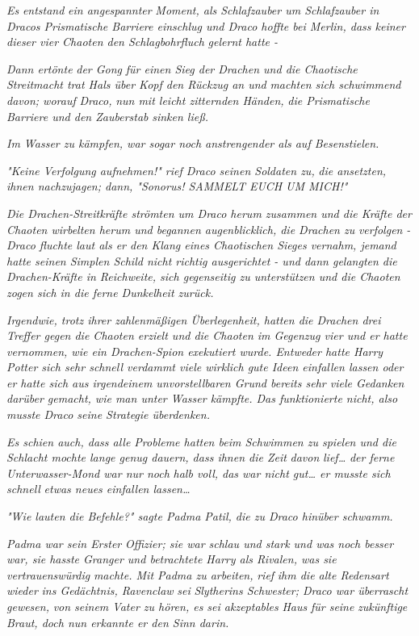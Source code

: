 {\emph{Es} \emph{entstand} \emph{ein angespannter} \emph{Moment, als Schlafzauber um Schlafzauber in Dracos Prismatische Barriere einschlug und Draco hoffte bei Merlin, dass keiner dieser vier Chaoten den Schlagbohrfluch} \emph{gelernt hatte -}

\emph{Dann ertönte} \emph{der Gong} \emph{für einen Sieg der Drachen und die Chaotische Streitmacht trat Hals über Kopf den Rückzug an und} \emph{machten sich schwimmend davon; worauf} \emph{Draco,} \emph{nun mit leicht zitternden Händen,} \emph{die Prismatische Barriere und den Zauberstab} \emph{sinken ließ.}

\emph{Im Wasser zu kämpfen, war sogar noch anstrengender als auf Besenstielen.}

\emph{"\emph{Keine Verfolgung aufnehmen!}" rief Draco seinen Soldaten zu,} \emph{die ansetzten, ihnen nachzujagen; dann, "\emph{Sonorus! SAMMELT EUCH UM MICH!}"}

\emph{Die Drachen-Streitkräfte strömten um Draco herum zusammen und die Kräfte der Chaoten wirbelten herum und begannen augenblicklich, die Drachen zu} \emph{\emph{verfolgen}} \emph{- Draco fluchte laut als er den Klang eines Chaotischen Sieges vernahm, jemand hatte seinen Simplen Schild nicht richtig ausgerichtet - und dann gelangten die Drachen-Kräfte in Reichweite, sich gegenseitig zu unterstützen und die Chaoten zogen sich in die ferne Dunkelheit zurück.}

\emph{Irgendwie, trotz ihrer zahlenmäßigen Überlegenheit, hatten die Drachen drei Treffer gegen die Chaoten erzielt und die Chaoten im Gegenzug vier und er hatte vernommen, wie ein Drachen-Spion exekutiert wurde. Entweder hatte Harry Potter sich sehr schnell verdammt viele wirklich gute Ideen einfallen lassen oder er hatte sich aus irgendeinem unvorstellbaren Grund bereits sehr viele Gedanken darüber gemacht, wie man unter Wasser kämpfte. Das funktionierte nicht, also musste Draco seine Strategie überdenken.}

\emph{Es schien auch, dass alle Probleme hatten beim Schwimmen zu spielen und die Schlacht mochte lange genug dauern, dass ihnen die Zeit} \emph{davon} \emph{lief…} \emph{der ferne Unterwasser-Mond war nur noch} \emph{halb voll, das war nicht gut… er musste sich} \emph{\emph{schnell}} \emph{etwas neues einfallen lassen…}

\emph{"Wie lauten die Befehle?" sagte Padma Patil, die zu Draco hinüber schwamm.}

\emph{Padma war sein Erster} \emph{Offizier; sie war schlau und stark und was noch besser war, sie hasste Granger und betrachtete Harry als Rivalen, was sie} \emph{\emph{vertrauenswürdig}} \emph{machte. Mit Padma zu arbeiten,} \emph{rief} \emph{ihm die alte Redensart} \emph{wieder} \emph{ins Gedächtnis, Ravenclaw} \emph{sei} \emph{Slytherins Schwester; Draco war überrascht gewesen,} \emph{von seinem Vater zu hören, es sei akzeptables} \emph{Haus} \emph{für seine} \emph{zukünftige Braut, doch nun erkannte er den Sinn darin.}

}
